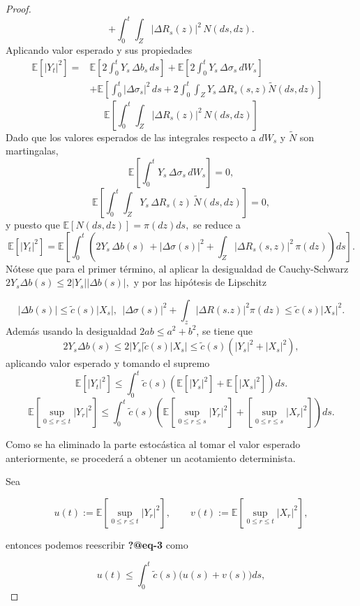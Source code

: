 \documentclass[
  spanish,
  us-letterpaper,
]{scrreprt}
\theoremstyle{plain}
\theoremstyle{plain}
\theoremstyle{definition}
\theoremstyle{remark}
\begin{document}
\begin{proof}
\[+ \int_0^t \int_Z |\Delta R_s(z)|^2 \, N(ds, dz).\] Aplicando valor
esperado y sus propiedades \[\begin{aligned}
\mathbb{E}[
|Y_t|^2] = {}& \mathbb{E}\left[2 \int_0^t Y_s \, \Delta b_s \, ds \right]
+\mathbb{E}\left[ 2 \int_0^t Y_s \, \Delta \sigma_s \, dW_s \right]  {}& \\
& +\mathbb{E}\left[ \int_0^t |\Delta \sigma_s|^2 \, ds
+ 2 \int_0^t \int_Z Y_s \, \Delta R_s(s,z) \tilde{N}(ds, dz)\right]
\end{aligned}\]
\[\mathbb{E}\left[\int_0^t \int_Z |\Delta R_s(z)|^2 \, N(ds, dz)\right]\]
Dado que los valores esperados de las integrales respecto a \(dW_s\) y
\(\widetilde{N}\) son martingalas,
\[\mathbb{E}\left[ \int_0^t Y_s \, \Delta \sigma_s \, dW_s \right] = 0,\]
\[\mathbb{E} \left[  \int_0^t \int_Z Y_s \, \Delta R_s(z) \, \tilde{N}(ds, dz)\right]  = 0,\]
y puesto que \(\mathbb{E}[N(ds,dz)] = \pi(dz)ds,\) se reduce a
\[\mathbb{E}[|Y_t|^2] = \mathbb{E}\left[\int_0^t \left(2Y_s \, \Delta b(s) \, + |\Delta \sigma(s)|^2 + \int_Z |\Delta R_s(s,z)|^2 \, \pi ( dz)\right) ds\right].\]
Nótese que para el primer término, al aplicar la desigualdad de
Cauchy-Schwarz \(2Y_s\Delta b(s)\leq 2|Y_s||\Delta b(s)|,\) y por las
hipótesis de Lipschitz

\[|\Delta b(s) |\leq \widetilde{c}(s)|X_s|, \ \ |\Delta \sigma(s)|^2 + \int_z |\Delta R(s.z)|^2 \pi(dz) \leq \widetilde{c}(s)|X_s|^2.\]
Además usando la desigualdad \(2ab \leq a^2 + b^2\), se tiene que
\[2Y_s\Delta b(s) \leq 2|Y_s |\widetilde{c}(s)|X_s| \leq \widetilde{c}(s)(|Y_s|^2 + |X_s|^2),\]
aplicando valor esperado y tomando el supremo
\[\mathbb{E}[|{Y_t}|^2] \leq \int_0^t \widetilde{c}(s) \left( \mathbb{E}[|{Y_s}|^2] + \mathbb{E}[|{X_s}|^2] \right) ds.\]
\[\mathbb{E}\!\left[ \sup_{0 \leq r \leq t} |{Y_r}|^2 \right] \leq \int_0^t \widetilde{c}(s) \left( \mathbb{E}\!\left[ \sup_{0 \leq r \leq s} |{Y_r}|^2 \right] + \!\left[ \sup_{0 \leq r \leq s} |{X_r}|^2 \right] \right) ds.\]

Como se ha eliminado la parte estocástica al tomar el valor esperado
anteriormente, se procederá a obtener un acotamiento determinista.

Sea

\[u(t) := \mathbb{E}\!\left[ \sup_{0 \leq r \leq t} |{Y_r}|^2 \right], \qquad v(t) := \mathbb{E}\!\left[ \sup_{0 \leq r \leq t} |{X_r}|^2 \right],\]

entonces podemos reescribir \textbf{?@eq-3} como

\[u(t) \leq \int_0^t \widetilde{c}(s) \bigl( u(s) + v(s) \bigr) ds,\]


\end{proof}
\end{document}
